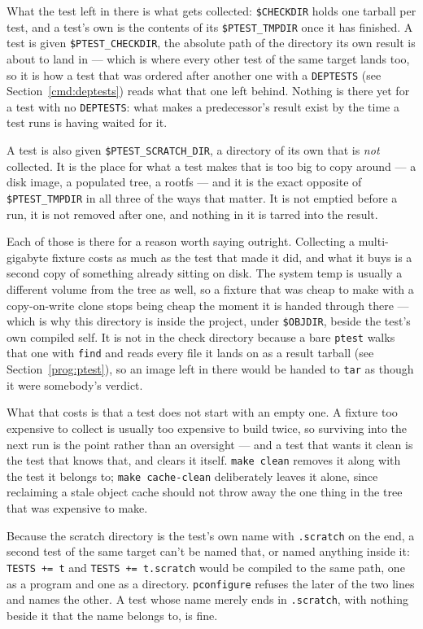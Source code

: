 \documentclass{article}
\begin{document}
What the test left in there is what gets collected: \texttt{\$CHECKDIR}
holds one tarball per test, and a test's own is the contents of its
\texttt{\$PTEST\_TMPDIR} once it has finished.  A test is given
\texttt{\$PTEST\_CHECKDIR}, the absolute path of the directory its own
result is about to land in --- which is where every other test of the
same target lands too, so it is how a test that was ordered after
another one with a \texttt{DEPTESTS} (see Section~\ref{cmd:deptests})
reads what that one left behind.  Nothing is there yet for a test with
no \texttt{DEPTESTS}: what makes a predecessor's result exist by the
time a test runs is having waited for it.

A test is also given \texttt{\$PTEST\_SCRATCH\_DIR}, a directory of
its own that is \textit{not} collected.  It is the place for what a
test makes that is too big to copy around --- a disk image, a
populated tree, a rootfs --- and it is the exact opposite of
\texttt{\$PTEST\_TMPDIR} in all three of the ways that matter.  It is
not emptied before a run, it is not removed after one, and nothing in
it is tarred into the result.

Each of those is there for a reason worth saying outright.  Collecting
a multi-gigabyte fixture costs as much as the test that made it did,
and what it buys is a second copy of something already sitting on
disk.  The system temp is usually a different volume from the tree as
well, so a fixture that was cheap to make with a copy-on-write clone
stops being cheap the moment it is handed through there --- which is
why this directory is inside the project, under \texttt{\$OBJDIR},
beside the test's own compiled self.  It is not in the check directory
because a bare \texttt{ptest} walks that one with \texttt{find} and
reads every file it lands on as a result tarball (see
Section~\ref{prog:ptest}), so an image left in there would be handed
to \texttt{tar} as though it were somebody's verdict.

What that costs is that a test does not start with an empty one.  A
fixture too expensive to collect is usually too expensive to build
twice, so surviving into the next run is the point rather than an
oversight --- and a test that wants it clean is the test that knows
that, and clears it itself.  \texttt{make clean} removes it along with
the test it belongs to; \texttt{make cache-clean} deliberately leaves
it alone, since reclaiming a stale object cache should not throw away
the one thing in the tree that was expensive to make.

Because the scratch directory is the test's own name with
\texttt{.scratch} on the end, a second test of the same target can't be
named that, or named anything inside it: \texttt{TESTS += t} and
\texttt{TESTS += t.scratch} would be compiled to the same path, one as
a program and one as a directory.  \texttt{pconfigure} refuses the
later of the two lines and names the other.  A test whose name merely
ends in \texttt{.scratch}, with nothing beside it that the name belongs
to, is fine.
\end{document}
